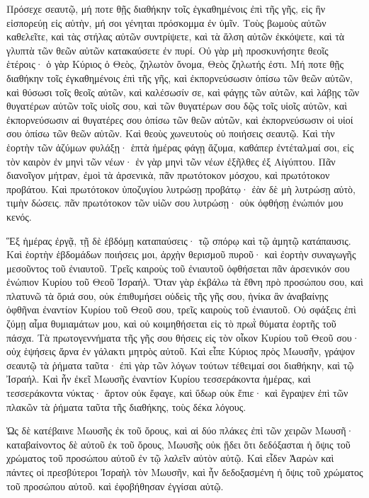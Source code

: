 {Πρόσεχε σεαυτῷ, μή ποτε θῇς διαθήκην τοῖς ἐγκαθημένοις ἐπὶ τῆς γῆς, εἰς ἣν εἰσπορεύῃ εἰς αὐτὴν, μή σοι γένηται πρόσκομμα ἐν ὑμῖν.
Τοὺς βωμοὺς αὐτῶν καθελεῖτε, καὶ τὰς στήλας αὐτῶν συντρίψετε, καὶ τὰ ἄλση αὐτῶν ἐκκόψετε, καὶ τὰ γλυπτὰ τῶν θεῶν αὐτῶν κατακαύσετε ἐν πυρί.
Οὐ γὰρ μὴ προσκυνήσητε θεοῖς ἑτέροις· ὁ γὰρ Κύριος ὁ Θεὸς, ζηλωτὸν ὄνομα, Θεὸς ζηλωτής ἐστι.
Μή ποτε θῇς διαθήκην τοῖς ἐγκαθημένοις ἐπὶ τῆς γῆς, καὶ ἐκπορνεύσωσιν ὀπίσω τῶν θεῶν αὐτῶν, καὶ θύσωσι τοῖς θεοῖς αὐτῶν, καὶ καλέσωσίν σε, καὶ φάγῃς τῶν αὐτῶν,
καὶ λάβῃς τῶν θυγατέρων αὐτῶν τοῖς υἱοῖς σου, καὶ τῶν θυγατέρων σου δῷς τοῖς υἱοῖς αὐτῶν, καὶ ἐκπορνεύσωσιν αἱ θυγατέρες σου ὀπίσω τῶν θεῶν αὐτῶν, καὶ ἐκπορνεύσωσιν οἱ υἱοί σου ὀπίσω τῶν θεῶν αὐτῶν.
Καὶ θεοὺς χωνευτοὺς οὐ ποιήσεις σεαυτῷ.
Καὶ τὴν ἑορτὴν τῶν ἀζύμων φυλάξῃ· ἑπτὰ ἡμέρας φάγῃ ἄζυμα, καθάπερ ἐντέταλμαί σοι, εἰς τὸν καιρὸν ἐν μηνὶ τῶν νέων· ἐν γὰρ μηνὶ τῶν νέων ἐξῆλθες ἐξ Αἰγύπτου.
Πᾶν διανοῖγον μήτραν, ἐμοὶ τὰ ἀρσενικὰ, πᾶν πρωτότοκον μόσχου, καὶ πρωτότοκον προβάτου.
Καὶ πρωτότοκον ὑποζυγίου λυτρώσῃ προβάτῳ· ἐὰν δὲ μὴ λυτρώσῃ αὐτὸ, τιμὴν δώσεις. πᾶν πρωτότοκον τῶν υἱῶν σου λυτρώσῃ· οὐκ ὀφθήσῃ ἐνώπιόν μου κενός.
\par }{\PP {}Ἓξ ἡμέρας ἐργᾷ, τῇ δὲ ἑβδόμῃ καταπαύσεις· τῷ σπόρῳ καὶ τῷ ἀμητῷ κατάπαυσις.
Καὶ ἑορτὴν ἑβδομάδων ποιήσεις μοι, ἀρχὴν θερισμοῦ πυροῦ· καὶ ἐορτὴν συναγωγῆς μεσοῦντος τοῦ ἐνιαυτοῦ.
Τρεῖς καιροὺς τοῦ ἐνιαυτοῦ ὀφθήσεται πᾶν ἀρσενικόν σου ἐνώπιον Κυρίου τοῦ Θεοῦ Ἰσραήλ.
Ὅταν γὰρ ἐκβάλω τὰ ἔθνη πρὸ προσώπου σου, καὶ πλατυνῶ τὰ ὅριά σου, οὐκ ἐπιθυμήσει οὐδεὶς τῆς γῆς σου, ἡνίκα ἂν ἀναβαίνῃς ὀφθῆναι ἐναντίον Κυρίου τοῦ Θεοῦ σου, τρεῖς καιροὺς τοῦ ἐνιαυτοῦ.
Οὐ σφάξεις ἐπὶ ζύμῃ αἷμα θυμιαμάτων μου, καὶ οὐ κοιμηθήσεται εἰς τὸ πρωῒ θύματα ἑορτῆς τοῦ πάσχα.
Τὰ πρωτογεννήματα τῆς γῆς σου θήσεις εἰς τὸν οἶκον Κυρίου τοῦ Θεοῦ σου· οὐχ ἑψήσεις ἄρνα ἐν γάλακτι μητρὸς αὐτοῦ.
Καὶ εἶπε Κύριος πρὸς Μωυσῆν, γράψον σεαυτῷ τὰ ῥήματα ταῦτα· ἐπὶ γὰρ τῶν λόγων τούτων τέθειμαί σοι διαθήκην, καὶ τῷ Ἰσραήλ.
Καὶ ἦν ἐκεῖ Μωυσῆς ἐναντίον Κυρίου τεσσεράκοντα ἡμέρας, καὶ τεσσεράκοντα νύκτας· ἄρτον οὐκ ἔφαγε, καὶ ὕδωρ οὐκ ἔπιε· καὶ ἔγραψεν ἐπὶ τῶν πλακῶν τὰ ῥήματα ταῦτα τῆς διαθήκης, τοὺς δέκα λόγους.
\par }{\PP {}Ὡς δὲ κατέβαινε Μωυσῆς ἐκ τοῦ ὄρους, καὶ αἱ δύο πλάκες ἐπὶ τῶν χειρῶν Μωυσῆ· καταβαίνοντος δὲ αὐτοῦ ἐκ τοῦ ὄρους, Μωυσῆς οὐκ ᾔδει ὅτι δεδόξασται ἡ ὄψις τοῦ χρώματος τοῦ προσώπου αὐτοῦ ἐν τῷ λαλεῖν αὐτὸν αὐτῷ.
Καὶ εἶδεν Ἀαρὼν καὶ πάντες οἱ πρεσβύτεροι Ἰσραὴλ τὸν Μωυσῆν, καὶ ἦν δεδοξασμένη ἡ ὄψις τοῦ χρώματος τοῦ προσώπου αὐτοῦ. καὶ ἐφοβήθησαν ἐγγίσαι αὐτῷ.
}
